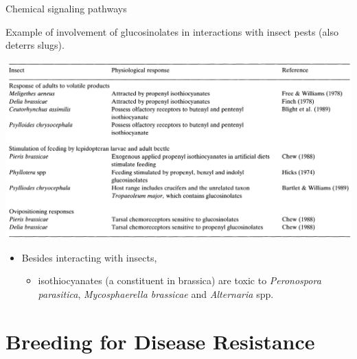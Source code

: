 \documentclass[10pt,dvipsnames,ignorenonframetext,aspectratio=169]{beamer}
\providecommand{\tightlist}{%
  \setlength{\itemsep}{0pt}\setlength{\parskip}{0pt}}
\begin{document}
\begin{frame}{}
\protect\hypertarget{section-1}{}
\end{frame}

\begin{frame}{Chemical signaling pathways}
\protect\hypertarget{chemical-signaling-pathways}{}
\begin{small}

Example of involvement of glucosinolates in interactions with insect
pests (also deterrs slugs).

\begin{center}\includegraphics[width=0.66\linewidth]{../images/insect_glucosinolate_signalling} \end{center}

\vspace{-0.5cm}

\begin{itemize}
\tightlist
\item
  Besides interacting with insects,

  \begin{itemize}
  \tightlist
  \item
    isothiocyanates (a constituent in brassica) are toxic to
    \emph{Peronospora parasitica}, \emph{Mycosphaerella brassicae} and
    \emph{Alternaria} spp.
  \end{itemize}
\end{itemize}

\end{small}
\end{frame}

\hypertarget{breeding-for-disease-resistance}{%
\section{Breeding for Disease
Resistance}\label{breeding-for-disease-resistance}}
\end{document}
